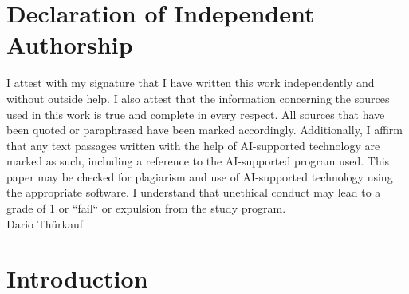 \documentclass[12pt,a4paper,titlepage,oneside,english]{article}
\begin{document}
\section*{Declaration of Independent Authorship}
I attest with my signature that I have written this work independently and without outside help. I also attest that the information concerning the sources used in this work is true and complete in every respect. All sources that have been quoted or paraphrased have been marked accordingly. 
Additionally, I affirm that any text passages written with the help of AI-supported technology are marked as such, including a reference to the AI-supported program used. This paper may be checked for plagiarism and use of AI-supported technology using the appropriate software. I understand that unethical conduct may lead to a grade of 1 or ``fail`` or expulsion from the study program.\\

Dario Thürkauf

\begin{figure}[h!]
	\centering
	\hspace{-10cm}
\end{figure}

\newpage
\onehalfspacing
{}



\section{Introduction}
\end{document}

